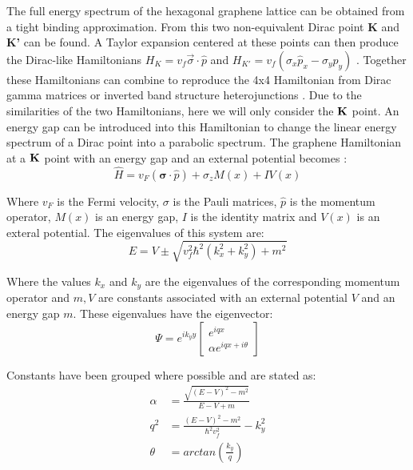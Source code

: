 \documentclass[prl,twocolumn,aps,superscriptaddress,floatfix,10pt]{revtex4}
\begin{document}
	The full energy spectrum of the hexagonal graphene lattice can be obtained from a tight binding approximation. From this two non-equivalent Dirac point {\bf K} and {\bf K'} can be found. A Taylor expansion centered at these points can then produce the Dirac-like Hamiltonians $H_{K}=v_{f}\vec{\sigma} \cdot \hat{p}$ and $H_{K'}=v_{f}\left(\sigma_{x}\hat{p}_{x}-\sigma_{y}\hat{p}_{y}\right)$ \cite{b1}. Together these Hamiltonians can combine to reproduce the 4x4 Hamiltonian from Dirac gamma matrices or inverted band structure heterojunctions \cite{d4}.  Due to the similarities of the two Hamiltonians, here we will only consider the ${\bf K}$ point. An energy gap can be introduced into this Hamiltonian to change the linear energy spectrum of a Dirac point into a parabolic spectrum. The graphene Hamiltonian at a ${\bf K}$ point with an energy gap and an external potential becomes \cite{b2,b3,b4}:
\begin{equation}
	\hat{H}=v_F (\boldsymbol{\sigma}\cdot\hat{p})+\sigma_{z}M\left(x\right)+IV\left(x\right)
	\label{hamiltonian} 	
\end{equation}

	Where $v_{F}$ is the Fermi velocity, $\sigma$ is the Pauli matrices, $\hat{p}$ is the momentum operator, $M(x)$ is an energy gap, $I$ is the identity matrix and $V(x)$ is an exteral potential. The eigenvalues of this system are:
\begin{equation}
	E=V\pm\sqrt{v_{f}^{2}\hbar^{2}\left(k_{x}^{2}+k_{y}^{2}\right)+m^{2}}
	\label{eigenvalue} 
\end{equation}

	Where the values $k_{x}$ and $k_{y}$ are the eigenvalues of the corresponding momentum operator and $m, V$ are constants associated with an external potential $V$ and an energy gap $m$. These eigenvalues have the eigenvector:
\begin{equation}
	\Psi=
	e^{ik_{y}y}
	\left[\begin{array}{ccc}
		e^{iqx}\\
		\alpha e^{iqx+i\theta}
	\end{array}\right]
	\label{psi}
\end{equation}

	Constants have been grouped where possible and are stated as:
\begin{align}
	\alpha&=\frac{\sqrt{\left(E-V\right)^{2}-m^{2}}}{E-V+m}\\
	q^{2}&=\frac{\left(E-V\right)^{2}-m^{2}}{\hbar^{2}v_{f}^{2}}-k_{y}^{2}\\
	\theta&=arctan\left(\frac{k_{y}}{q}\right)
\end{align}
\end{document}
